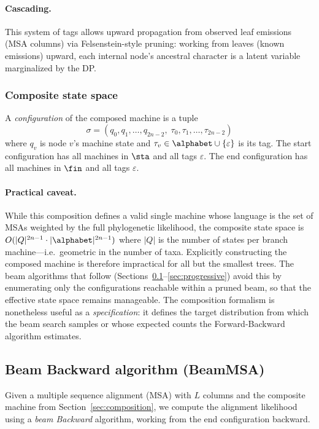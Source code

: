 \paragraph{Cascading.}
This system of tags allows upward propagation from observed leaf emissions (MSA columns)
via Felsenstein-style pruning:
working from leaves (known emissions) upward, each internal node's ancestral character
is a latent variable marginalized by the DP.

\subsubsection{Composite state space}

A \emph{configuration} of the composed machine is a tuple
\[
\sigma = (q_0, q_1, \ldots, q_{2n-2},\; \tau_0, \tau_1, \ldots, \tau_{2n-2})
\]
where $q_v$ is node $v$'s machine state and $\tau_v \in \alphabet \cup \{\varepsilon\}$ is its tag.
The start configuration has all machines in $\sta$ and all tags $\varepsilon$.
The end configuration has all machines in $\fin$ and all tags $\varepsilon$.

\paragraph{Practical caveat.}
While this composition defines a valid single machine whose language is the set of MSAs
weighted by the full phylogenetic likelihood, the composite state space is
$O(|Q|^{2n-1} \cdot |\alphabet|^{2n-1})$ where $|Q|$ is the number of states per branch machine---i.e.\
geometric in the number of taxa.
Explicitly constructing the composed machine is therefore impractical for all but
the smallest trees.
The beam algorithms that follow (Sections~\ref{sec:beam-backward}--\ref{sec:progressive})
avoid this by enumerating only the configurations reachable within a pruned beam,
so that the effective state space remains manageable.
The composition formalism is nonetheless useful as a \emph{specification}:
it defines the target distribution from which the beam search samples or
whose expected counts the Forward-Backward algorithm estimates.

\subsection{Beam Backward algorithm (BeamMSA)}
\label{sec:beam-backward}

Given a multiple sequence alignment (MSA) with $L$ columns
and the composite machine from Section~\ref{sec:composition},
we compute the alignment likelihood using a \emph{beam Backward} algorithm,
working from the end configuration backward.

